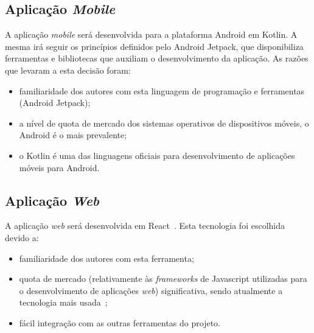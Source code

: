 \subsection{Aplicação \textit{Mobile}}
A aplicação \textit{mobile} será desenvolvida para a plataforma Android em Kotlin. A mesma irá seguir os princípios definidos pelo Android Jetpack, que disponibiliza ferramentas e bibliotecas que auxiliam o desenvolvimento da aplicação. As razões que levaram a esta decisão foram:
\begin{itemize}
	\item familiaridade dos autores com esta linguagem de programação e ferramentas (Android Jetpack);
	\item a nível de quota de mercado dos sistemas operativos de dispositivos móveis, o Android é o mais prevalente;
	\item o Kotlin é uma das linguagens oficiais para desenvolvimento de aplicações móveis para Android.
\end{itemize}

\subsection{Aplicação \textit{Web}}
A aplicação \textit{web} será desenvolvida em React~\cite{angular_vs_react}. Esta tecnologia foi escolhida devido a:

\begin{itemize}
	\item familiaridade dos autores com esta ferramenta;
	\item quota de mercado (relativamente às \textit{frameworks} de Javascript utilizadas para o desenvolvimento de aplicações \textit{web}) significativa, sendo atualmente a tecnologia mais usada~\cite{angular_vs_react};
	\item fácil integração com as outras ferramentas do projeto.
\end{itemize}

